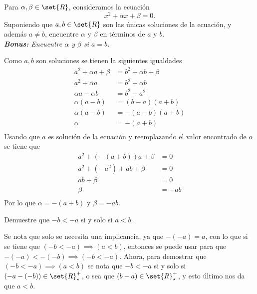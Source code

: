 \documentclass{ayudantia}
\begin{document}
\begin{prob}
    Para \(\alpha,\beta\in\set{R}\), consideramos la ecuación
    \begin{equation*}
        x^2+\alpha x+\beta=0.
    \end{equation*}
    Suponiendo que \(a,b\in\set{R}\) son las únicas soluciones de la ecuación, y además \(a\neq b\), encuentre \(\alpha\) y \(\beta\) en términos de \(a\) y \(b\).\\
    \textit{\textbf{Bonus:} Encuentre \(\alpha\) y \(\beta\) si \(a=b\).}
\end{prob}

\begin{ans}
    \begin{sol}
        Como \(a,b\) son soluciones se tienen la siguientes igualdades
        \begin{align*}
            a^2+\alpha a+\beta&=b^2+\alpha b+\beta\\
            a^2+\alpha a&=b^2+\alpha b\\
            \alpha a-\alpha b&=b^2-a^2\\
            \alpha (a-b)&=(b-a)(a+b)\\
            \alpha (a-b)&=-(a-b)(a+b)\\
            \alpha&=-(a+b)\\
        \end{align*}
        Usando que \(a\) es solución de la ecuación y reemplazando el valor encontrado de \(\alpha\) se tiene que
        \begin{align*}
            a^2+(-(a+b))a+\beta&=0\\
            a^2+(-a^2)+ab+\beta&=0\\
            ab+\beta&=0\\
            \beta&=-ab\\
        \end{align*}
        Por lo que \(\alpha=-(a+b)\) y \(\beta=-ab\).
    \end{sol}
\end{ans}


\begin{prob}
    Demuestre que \(-b<-a\) si y solo si \(a<b\).
\end{prob}

\begin{ans}
    \begin{sol}
        Se nota que solo se necesita una implicancia, ya que \(-(-a)=a\), con lo que si se tiene que \((-b<-a)\implies (a<b)\), entonces se puede usar para que \(-(-a)<-(-b)\implies(-b<-a)\). Ahora, para demostrar que \((-b<-a)\implies(a<b)\) se nota que \(-b<-a\) si y solo si \((-a-(-b))\in\set{R}_\star^+\), o sea que \((b-a)\in\set{R}_\star^+\), y esto último nos da que \(a<b\).
    \end{sol}
\end{ans}
\end{document}
